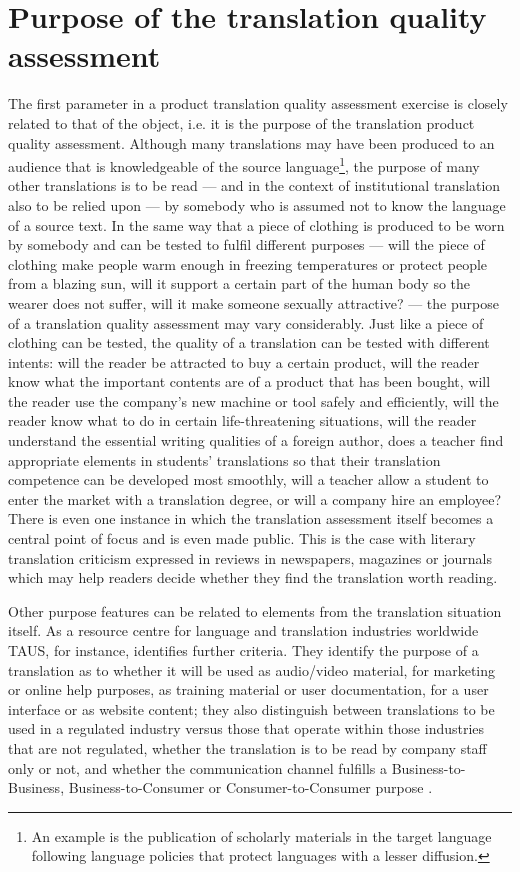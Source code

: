 \documentclass[output=paper]{langsci/langscibook}
\begin{document}
\section{Purpose of the translation quality assessment}\label{sec:vandepitte:2}

The first parameter in a product translation quality assessment exercise is closely related to that of the object, i.e. it is the purpose of the translation product quality assessment. Although many translations may have been produced to an audience that is knowledgeable of the source language\footnote{An example is the publication of scholarly materials in the target language following language policies that protect languages with a lesser diffusion.}, the purpose of many other translations is to be read — and in the context of institutional translation also to be relied upon — by somebody who is assumed not to know the language of a source text. In the same way that a piece of clothing is produced to be worn by somebody and can be tested to fulfil different purposes — will the piece of clothing make people warm enough in freezing temperatures or protect people from a blazing sun, will it support a certain part of the human body so the wearer does not suffer, will it make someone sexually attractive? — the purpose of a translation quality assessment may vary considerably. Just like a piece of clothing can be tested, the quality of a translation can be tested with different intents: will the reader be attracted to buy a certain product, will the reader know what the important contents are of a product that has been bought, will the reader use the company's new machine or tool safely and efficiently, will the reader know what to do in certain life-threatening situations, will the reader understand the essential writing qualities of a foreign author, does a teacher find appropriate elements in students' translations so that their translation competence can be developed most smoothly, will a teacher allow a student to enter the market with a translation degree, or will a company hire an employee? There is even one instance in which the translation assessment itself becomes a central point of focus and is even made public. This is the case with literary translation criticism expressed in reviews in newspapers, magazines or journals which may help readers decide whether they find the translation worth reading.

Other purpose features can be related to elements from the translation situation itself. As a resource centre for language and translation industries worldwide TAUS, for instance, identifies further criteria. They identify the purpose of a translation as to whether it will be used as audio/video material, for marketing or online help purposes, as training material or user documentation, for a user interface or as website content; they also distinguish between translations to be used in a regulated industry versus those that operate within those industries that are not regulated, whether the translation is to be read by company staff only or not, and whether the communication channel fulfills a Business-to-Business, Business-to-Consumer or Consumer-to-Consumer purpose \citep{TAUS2013}.
\end{document}
